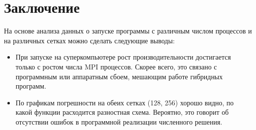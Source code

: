 \documentclass[a4paper,hidelinks,12pt]{article}
\begin{document}
\section{Заключение}

На основе анализа данных о запуске программы с различным числом процессов и на различных сетках можно сделать следующие выводы:

\begin{itemize}
    \item При запуске на суперкомпьютере рост производительности достигается только с ростом числа MPI процессов. Скорее всего, это связано с программным или аппаратным сбоем, мешающим работе гибридных программ.

    \item По графикам погрешности на обеих сетках (128, 256) хорошо видно, по какой функции расходится разностная схема. Вероятно, это говорит об отсутствии ошибок в программной реализации численного решения.
\end{itemize}
    
\end{document}
